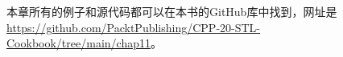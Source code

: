 

本章所有的例子和源代码都可以在本书的GitHub库中找到，网址是\url{https://github.com/PacktPublishing/CPP-20-STL-Cookbook/tree/main/chap11}。